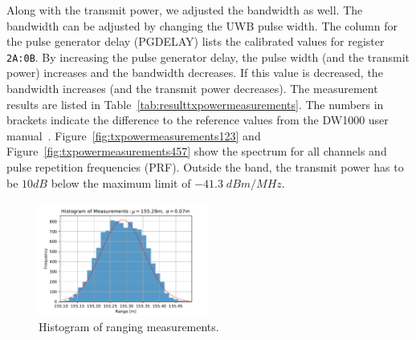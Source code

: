 \documentclass[journal,comsoc]{IEEEtran}
\begin{document}
Along with the transmit power, we adjusted the bandwidth as well.
The bandwidth can be adjusted by changing the UWB pulse width.
The column for the pulse generator delay (PGDELAY) lists the calibrated values for register \texttt{2A:0B}.
By increasing the pulse generator delay, the pulse width (and the transmit power) increases and the bandwidth decreases.
If this value is decreased, the bandwidth increases (and the transmit power decreases).
The measurement results are listed in Table~\ref{tab:resulttxpowermeasurements}.
The numbers in brackets indicate the difference to the reference values from the DW1000 user manual~\cite{dw1000um}.
Figure~\ref{fig:txpowermeasurements123} and Figure~\ref{fig:txpowermeasurements457} show the spectrum for all channels and pulse repetition frequencies (PRF).
Outside the band, the transmit power has to be $10dB$ below the maximum limit of $-41.3 \; dBm/MHz$.

\begin{figure}[b!]
	\centering
	\includegraphics[width=0.5\textwidth]{Figures/histogram}
	\caption{Histogram of ranging measurements.}
	\label{fig:antennadelayranging}
\end{figure}
\end{document}
